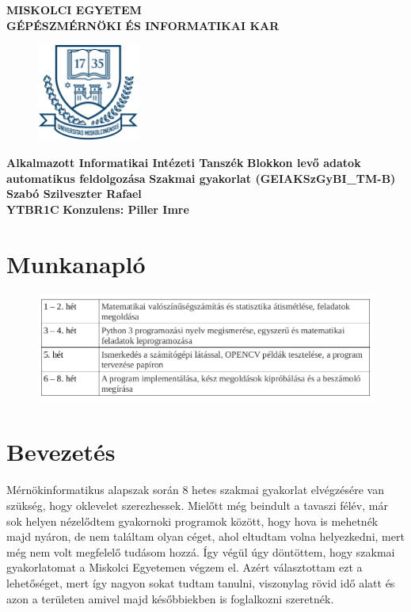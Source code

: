 \documentclass[a4paper,12pt]{article}
\begin{document}
\begin{center}
	\Large \textbf{MISKOLCI EGYETEM}
	\\
	\Large \textbf{GÉPÉSZMÉRNÖKI ÉS INFORMATIKAI KAR}
	\vskip 1cm
	\begin{figure}[h]
		\centering
		\includegraphics[width=0.3\textwidth]{logo}
	\end{figure}
	\Large \textbf{Alkalmazott Informatikai Intézeti Tanszék}
	\vskip 1cm
	\huge \textbf{Blokkon levő adatok automatikus feldolgozása}
	\vskip 1cm
	\Large \textbf{Szakmai gyakorlat (GEIAKSzGyBI{\_}TM-B)}
	\vskip 1cm
	\huge \textbf{Szabó Szilveszter Rafael}
	\\
	\LARGE \textbf{YTBR1C}
	\vskip 1cm
	\Large \textbf{Konzulens: Piller Imre}

\end{center}

\newpage
\tableofcontents

\newpage 
\section{Munkanapló}
\begin{figure}[h]
	\centering
	\includegraphics[width=16cm]{munka}
	
\end{figure}

\newpage
\section{Bevezetés}
Mérnökinformatikus alapszak során 8 hetes szakmai gyakorlat elvégzésére van szükség, hogy  oklevelet szerezhessek. Mielőtt még beindult a tavaszi félév, már sok helyen nézelődtem gyakornoki programok között, hogy hova is mehetnék majd nyáron, de nem találtam olyan céget, ahol eltudtam volna helyezkedni, mert még nem volt megfelelő tudásom hozzá. Így végül úgy döntöttem, hogy szakmai gyakorlatomat a Miskolci Egyetemen végzem el. Azért választottam ezt a lehetőséget, mert így nagyon sokat tudtam tanulni, viszonylag rövid idő alatt és azon a területen amivel majd későbbiekben is foglalkozni szeretnék. 
 
\end{document}
